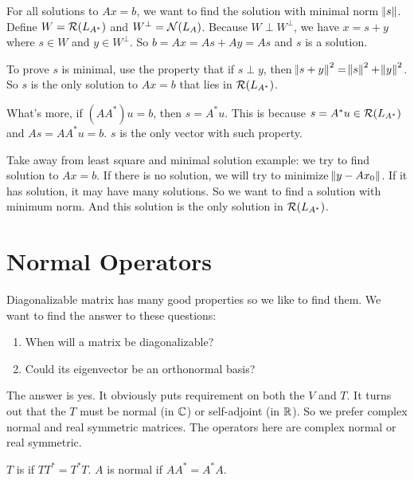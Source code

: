 \begin{example}
    For all solutions to $Ax=b$, we want to find the solution with minimal norm $\norm{s}$. Define $W = \rangespace{L_{A^*}}$ and $W^\perp = \nullspace{L_A}$. Because $W \perp W^\perp$, we have $x = s + y$ where $s \in W$ and $y \in W^\perp$. So $b = Ax = As + Ay = As$ and $s$ is a solution.
    
    To prove $s$ is minimal, use the property that if $s \perp y$, then $\norm{s+y}^2 = \norm{s}^2 + \norm{y}^2$. So $s$ is the only solution to $Ax=b$ that lies in $\rangespace{L_{A^*}}$.
    
    What's more, if $(AA^*)u = b$, then $s = A^* u$. This is because $s = A^* u \in \rangespace{L_{A^*}}$ and $As = AA^*u = b$. $s$ is the only vector with such property.
\end{example}

Take away from least square and minimal solution example: we try to find solution to $Ax = b$. If there is no solution, we will try to minimize $\norm{y - A x_0}$. If it has solution, it may have many solutions. So we want to find a solution with minimum norm. And this solution is the only solution in $\rangespace{L_{A^*}}$.




\section{Normal Operators}

Diagonalizable matrix has many good properties so we like to find them. We want to find the answer to these questions:
\begin{enumerate}
    \item When will a matrix be diagonalizable?
    \item Could its eigenvector be an orthonormal basis?
\end{enumerate}

The answer is yes. It obviously puts requirement on both the $V$ and $T$. It turns out that the $T$ must be normal (in $\mathbb{C}$) or self-adjoint (in $\mathbb{R}$). So we prefer complex normal and real symmetric matrices. The operators here are complex normal or real symmetric.

\begin{definition}[Normal]\label{normal_definition}
    $T$ is  if $TT^* = T^* T$. $A$ is normal if $AA^* = A^* A$.
\end{definition}

